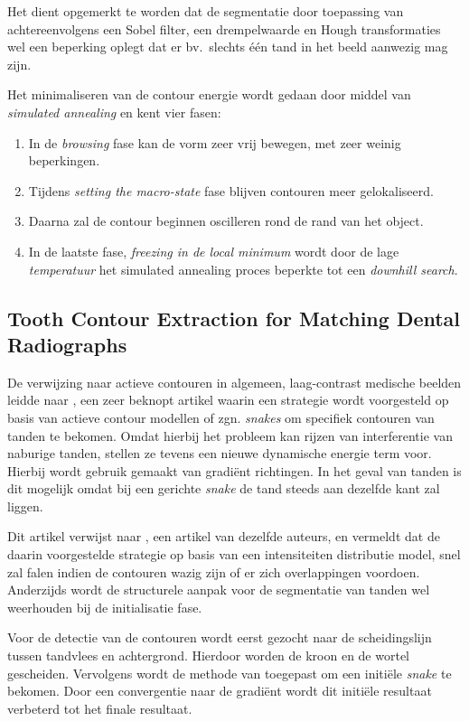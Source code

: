 \documentclass[10pt,a4paper]{article}
\begin{document}
Het dient opgemerkt te worden dat de segmentatie door toepassing van achtereenvolgens een Sobel filter, een drempelwaarde en Hough transformaties wel een beperking oplegt dat er bv.\ slechts \'e\'en tand in het beeld aanwezig mag zijn.

Het minimaliseren van de contour energie wordt gedaan door middel van \emph{simulated annealing} en kent vier fasen:

\begin{enumerate}
\item In de \emph{browsing} fase kan de vorm zeer vrij bewegen, met zeer weinig beperkingen.
\item Tijdens \emph{setting the macro-state} fase blijven contouren meer gelokaliseerd.
\item Daarna zal de contour beginnen oscilleren rond de rand van het object.
\item In de laatste fase, \emph{freezing in de local minimum} wordt door de lage \emph{temperatuur} het simulated annealing proces beperkte tot een \emph{downhill search}.
\end{enumerate}

\subsection*{Tooth Contour Extraction for Matching Dental Radiographs}

De verwijzing naar actieve contouren in algemeen, laag-contrast medische beelden leidde naar \cite{chen2004tooth}, een zeer beknopt artikel waarin een strategie wordt voorgesteld op basis van actieve contour modellen of zgn. \emph{snakes} om specifiek contouren van tanden te bekomen. Omdat hierbij het probleem kan rijzen van interferentie van naburige tanden, stellen ze tevens een nieuwe dynamische energie term voor. Hierbij wordt gebruik gemaakt van gradi\"ent richtingen. In het geval van tanden is dit mogelijk omdat bij een gerichte \emph{snake} de tand steeds aan dezelfde kant zal liggen.

Dit artikel verwijst naar \cite{jain2004matching}, een artikel van dezelfde auteurs, en vermeldt dat de daarin voorgestelde strategie op basis van een intensiteiten distributie model, snel zal falen indien de contouren wazig zijn of er zich overlappingen voordoen. Anderzijds wordt de structurele aanpak voor de segmentatie van tanden wel weerhouden bij de initialisatie fase.

Voor de detectie van de contouren wordt eerst gezocht naar de scheidingslijn tussen tandvlees en achtergrond. Hierdoor worden de kroon en de wortel gescheiden. Vervolgens wordt de methode van \cite{jain2004matching} toegepast om een initi\"ele \emph{snake} te bekomen. Door een convergentie naar de gradi\"ent  wordt dit initi\"ele resultaat verbeterd tot het finale resultaat.
\end{document}
